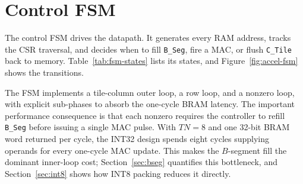 \section{Control FSM}
\label{sec:fsm}

The control FSM drives the datapath. It generates every RAM address, tracks
the CSR traversal, and decides when to fill \texttt{B\_Seg}, fire a MAC, or
flush \texttt{C\_Tile} back to memory. Table~\ref{tab:fsm-states} lists its
states, and Figure~\ref{fig:accel-fsm} shows the transitions.


The FSM implements a tile-column outer loop, a row loop, and a nonzero
loop, with explicit sub-phases to absorb the one-cycle BRAM latency. The
important performance consequence is that each nonzero requires the
controller to refill \texttt{B\_Seg} before issuing a single MAC pulse.
With $TN = 8$ and one 32-bit BRAM word returned per cycle, the INT32
design spends eight cycles supplying operands for every one-cycle MAC
update. This makes the $B$-segment fill the dominant inner-loop cost;
Section~\ref{sec:bseg} quantifies this bottleneck, and
Section~\ref{sec:int8} shows how INT8 packing reduces it directly.

\vspace{2cm}

